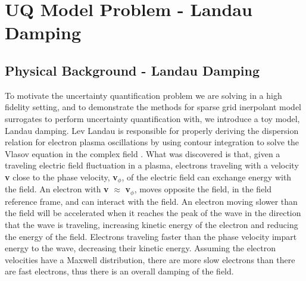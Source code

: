 \documentclass{article}
\begin{document}
\vspace{0.01cm}

%
%
%
%


\section{UQ Model Problem - Landau Damping}
\subsection{Physical Background - Landau Damping}
To motivate the uncertainty quantification problem we are solving in a high fidelity setting, and to demonstrate the methods for sparse grid inerpolant model surrogates to perform uncertainty quantification with, we introduce a toy model, Landau damping. Lev Landau is responsible for properly deriving the dispersion relation for electron plasma oscillations by using contour integration to solve the Vlasov equation in the complex field \cite{Chen}. What was discovered is that, given a traveling electric field fluctuation in a plasma, electrons traveling with a velocity \textbf{v} close to the phase velocity, \textbf{v}$_{\phi}$, of the electric field can exchange energy with the field. An electron with \textbf{v}  $\approx$ \textbf{ v}$_{\phi}$, moves opposite the field, in the field reference frame, and can interact with the field. An electron moving slower than the field will be accelerated when it reaches the peak of the wave in the direction that the wave is traveling, increasing kinetic energy of the electron and reducing the energy of the field. Electrons traveling faster than the phase velocity impart energy to the wave, decreasing their kinetic energy. Assuming the electron velocities have a Maxwell distribution, there are more slow electrons than there are fast electrons, thus there is an overall damping of the field.\\
\end{document}
